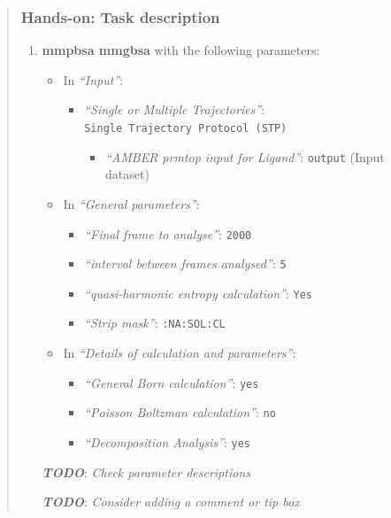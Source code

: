 \documentclass[twocolumn]{bmcart}%
\providecommand{\tightlist}{%
  \setlength{\itemsep}{0pt}\setlength{\parskip}{0pt}}
\providecommand{\tightlist}{%
  \setlength{\itemsep}{0pt}\setlength{\parskip}{0pt}}
\begin{document}
\begin{quote}
\hypertarget{hands-on-task-description-18}{%
\subsubsection{Hands-on: Task
description}\label{hands-on-task-description-18}}

\begin{enumerate}
\def\labelenumi{\arabic{enumi}.}
\tightlist
\item
  \textbf{mmpbsa mmgbsa} with the following parameters:

  \begin{itemize}
  \tightlist
  \item
    In \emph{``Input''}:

    \begin{itemize}
    \tightlist
    \item
      \emph{``Single or Multiple Trajectories''}:
      \texttt{Single\ Trajectory\ Protocol\ (STP)}

      \begin{itemize}
      \tightlist
      \item
        \emph{``AMBER prmtop input for Ligand''}: \texttt{output} (Input
        dataset)
      \end{itemize}
    \end{itemize}
  \item
    In \emph{``General parameters''}:

    \begin{itemize}
    \item
      \emph{``Final frame to analyse''}: \texttt{2000}
    \item
      \emph{``interval between frames analysed''}: \texttt{5}
    \item
      \emph{``quasi-harmonic entropy calculation''}: \texttt{Yes}
    \item
      \emph{``Strip mask''}: \texttt{:NA:SOL:CL}
    \end{itemize}
  \item
    In \emph{``Details of calculation and parameters''}:

    \begin{itemize}
    \tightlist
    \item
      \emph{``General Born calculation''}: \texttt{yes}
    \item
      \emph{``Poisson Boltzman calculation''}: \texttt{no}
    \item
      \emph{``Decomposition Analysis''}: \texttt{yes}
    \end{itemize}
  \end{itemize}

  \textbf{\emph{TODO}}: \emph{Check parameter descriptions}

  \textbf{\emph{TODO}}: \emph{Consider adding a comment or tip box}
\end{enumerate}


\end{quote}
\end{document}

